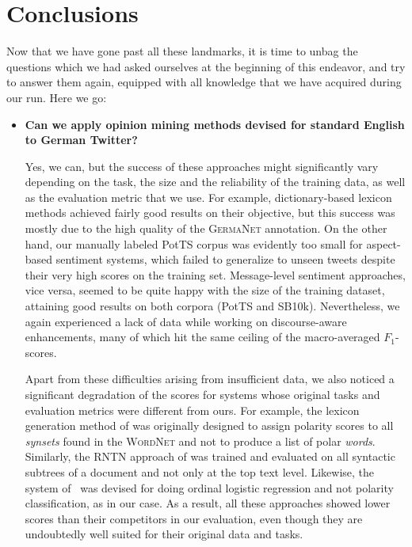 \documentclass[11pt]{article}
\newcommand{\F}[0]{$F_1$}
\begin{document}
\section{Conclusions}

Now that we have gone past all these landmarks, it is time to unbag
the questions which we had asked ourselves at the beginning of this
endeavor, and try to answer them again, equipped with all knowledge
that we have acquired during our run.  Here we go:

\begin{itemize}
  \item\textbf{Can we apply opinion mining methods devised for
    standard English to German Twitter?}

    Yes, we can, but the success of these approaches might
    significantly vary depending on the task, the size and the
    reliability of the training data, as well as the evaluation metric
    that we use. For example, dictionary-based lexicon methods
    achieved fairly good results on their objective, but this success
    was mostly due to the high quality of the \textsc{GermaNet}
    annotation.  On the other hand, our manually labeled PotTS corpus
    was evidently too small for aspect-based sentiment systems, which
    failed to generalize to unseen tweets despite their very high
    scores on the training set.  Message-level sentiment approaches,
    vice versa, seemed to be quite happy with the size of the training
    dataset, attaining good results on both corpora (PotTS and SB10k).
    Nevertheless, we again experienced a lack of data while working on
    discourse-aware enhancements, many of which hit the same ceiling
    of the macro-averaged \F{}-scores.

    Apart from these difficulties arising from insufficient data, we
    also noticed a significant degradation of the scores for systems
    whose original tasks and evaluation metrics were different from
    ours.  For example, the lexicon generation method of
    \citet{Esuli:05} was originally designed to assign polarity scores
    to all \emph{synsets} found in the \textsc{WordNet} and not to
    produce a list of polar \emph{words}.  Similarly, the RNTN
    approach of \citet{Socher:13} was trained and evaluated on all
    syntactic subtrees of a document and not only at the top text
    level.  Likewise, the system of~\citet{Yessenalina:11} was devised
    for doing ordinal logistic regression and not polarity
    classification, as in our case.  As a result, all these approaches
    showed lower scores than their competitors in our evaluation, even
    though they are undoubtedly well suited for their original data
    and tasks.


\end{itemize}
\end{document}
